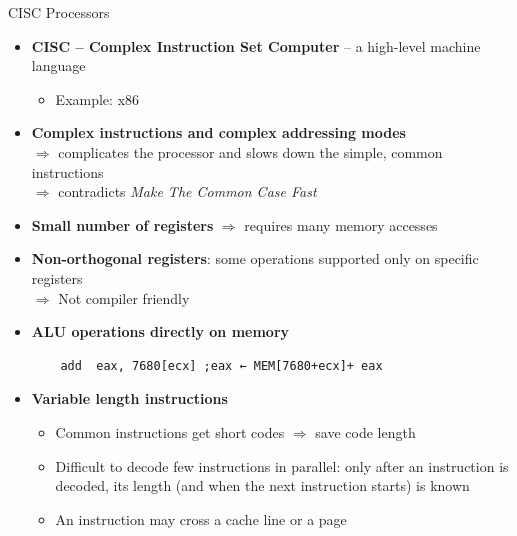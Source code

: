 \documentclass[aspectratio=169,12pt]{beamer}
\begin{document}
\begin{frame}[fragile]{CISC Processors}
\begin{itemize}
    \item \textbf{CISC -- Complex Instruction Set Computer} -- a high-level machine language
    \begin{itemize}
        \item Example: x86
    \end{itemize}
    \item \textbf{Complex instructions and complex addressing modes}\\
    $\Rightarrow$ complicates the processor and slows down the simple, common instructions\\
    $\Rightarrow$ contradicts \emph{Make The Common Case Fast}
    \item \textbf{Small number of registers} $\Rightarrow$ requires many memory accesses
    \item \textbf{Non-orthogonal registers}: some operations supported only on specific registers\\
    $\Rightarrow$ Not compiler friendly
    \item \textbf{ALU operations directly on memory}
    \begin{verbatim}
    add  eax, 7680[ecx] ;eax ← MEM[7680+ecx]+ eax
    \end{verbatim}
    \item \textbf{Variable length instructions}
    \begin{itemize}
        \item Common instructions get short codes $\Rightarrow$ save code length
        \item Difficult to decode few instructions in parallel: only after an instruction is decoded, its length (and when the next instruction starts) is known
        \item An instruction may cross a cache line or a page
    \end{itemize}
\end{itemize}
\end{frame}
\end{document}
